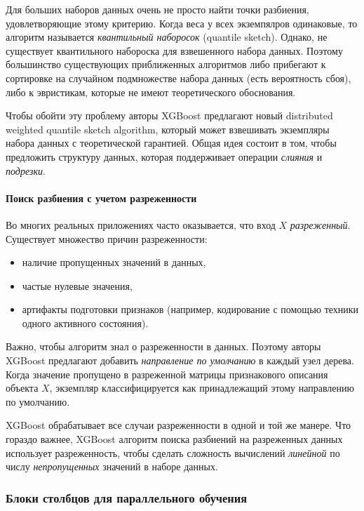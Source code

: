 \documentclass[%
	11pt,
	a4paper,
	utf8,
		]{article}
\begin{document}
Для больших наборов данных очень не просто найти точки разбиения, удовлетворяющие этому критерию. Когда веса у всех экземпялров одинаковые, то алгоритм называется \emph{квантильный наборосок} (quantile sketch). Однако, не существует квантильного набороска для взвешенного набора данных. Поэтому большинство существующих приближенных алгоритмов либо прибегают к сортировке на случайном подмножестве набора данных (есть вероятность сбоя), либо к эвристикам, которые не имеют теоретического обоснования.

Чтобы обойти эту проблему авторы XGBoost предлагают новый distributed weighted quantile sketch algorithm, который может взвешивать экземпляры набора данных с теоретической гарантией. Общая идея состоит в том, чтобы предложить структуру данных, которая поддерживает операции \emph{слияния} и \emph{подрезки}.

\paragraph{Поиск разбиения с учетом разреженности} 

Во многих реальных приложениях часто оказывается, что вход $ X $ \emph{разреженный}. Существует множество причин разреженности:
\begin{itemize}
	\item наличие пропущенных значений в данных,
	
	\item частые нулевые значения,
	
	\item артифакты подготовки признаков (например, кодирование с помощью техники одного активного состояния).
\end{itemize}

Важно, чтобы алгоритм знал о разреженности в данных. Поэтому авторы XGBoost предлагают добавить \emph{направление по умолчанию} в каждый узел дерева. Когда значение пропущено в разреженной матрицы признакового описания объекта $ X $, экземпляр классифицируется как принадлежащий этому направлению по умолчанию.

XGBoost обрабатывает все случаи разреженности в одной и той же манере. Что гораздо важнее, XGBoost алгоритм поиска разбиений на разреженных данных использует разреженность, чтобы сделать сложность вычислений \emph{линейной} по числу \emph{непропущенных} значений в наборе данных.

\subsubsection{Блоки столбцов для параллельного обучения}
\end{document}
